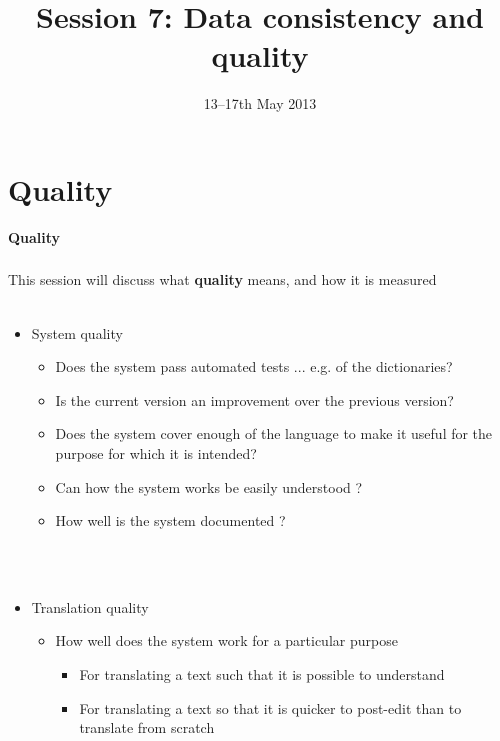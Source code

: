 \documentclass[10pt,xetex]{beamer} %
\date{13--17th May 2013}
\title{Session 7: Data consistency and quality}
\begin{document}
\begin{frame}
        \titlepage
\MyLogoBottomCentred
\end{frame}



\section{Quality}


\begin{frame} %
 \begin{center}
 {\Large {\bf Quality}} %
 \end{center}
\end{frame}
\begin{frame}
  \frametitle{}%

This session will discuss what \textbf{quality} means, and how it is measured \\

~\\

\begin{itemize}
  \item System quality
  \begin{itemize}

     \item Does the system pass automated tests ... e.g. of the dictionaries?
     \item Is the current version an improvement over the previous version?
     \item Does the system cover enough of the language to make it useful for the purpose for which it is intended?
     \item Can how the system works be easily understood ?
     \item How well is the system documented ? 
  \end{itemize}
~\\
~\\ 
  \item Translation quality
  \begin{itemize}

    \item How well does the system work for a particular purpose
    \begin{itemize}
      \item For translating a text such that it is possible to understand
      \item For translating a text so that it is quicker to post-edit than to translate from scratch
    \end{itemize}
  \end{itemize}
\end{itemize}

\end{frame}
\end{document}
